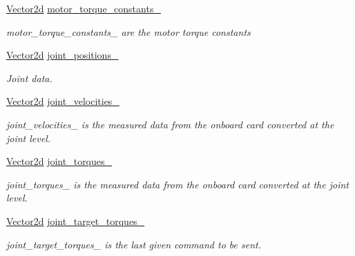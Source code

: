 \begin{DoxyCompactItemize}
\hyperlink{common__header_8hpp_acb6916bc8c9fe9d98c484fd4cc201447}{Vector2d} \hyperlink{classblmc__robots_1_1Teststand_a0d4bfad1f7afaaf459131667fac2b2d0}{motor\+\_\+torque\+\_\+constants\+\_\+}
\begin{DoxyCompactList}\small\item\em motor\+\_\+torque\+\_\+constants\+\_\+ are the motor torque constants \end{DoxyCompactList}\item 
\hyperlink{common__header_8hpp_acb6916bc8c9fe9d98c484fd4cc201447}{Vector2d} \hyperlink{classblmc__robots_1_1Teststand_a5ff6d1081ece6fadf9b3bac578b08001}{joint\+\_\+positions\+\_\+}
\begin{DoxyCompactList}\small\item\em Joint data. \end{DoxyCompactList}\item 
\mbox{\label{classblmc__robots_1_1Teststand_ab0a776f921bec24b81bc08f7ceebcba6}} 
\hyperlink{common__header_8hpp_acb6916bc8c9fe9d98c484fd4cc201447}{Vector2d} \hyperlink{classblmc__robots_1_1Teststand_ab0a776f921bec24b81bc08f7ceebcba6}{joint\+\_\+velocities\+\_\+}
\begin{DoxyCompactList}\small\item\em joint\+\_\+velocities\+\_\+ is the measured data from the onboard card converted at the joint level. \end{DoxyCompactList}\item 
\mbox{\label{classblmc__robots_1_1Teststand_a59ef3d86efd043ee1511bad70624bdae}} 
\hyperlink{common__header_8hpp_acb6916bc8c9fe9d98c484fd4cc201447}{Vector2d} \hyperlink{classblmc__robots_1_1Teststand_a59ef3d86efd043ee1511bad70624bdae}{joint\+\_\+torques\+\_\+}
\begin{DoxyCompactList}\small\item\em joint\+\_\+torques\+\_\+ is the measured data from the onboard card converted at the joint level. \end{DoxyCompactList}\item 
\mbox{\label{classblmc__robots_1_1Teststand_a0db888b3e84fe194629bb14b6fa2e485}} 
\hyperlink{common__header_8hpp_acb6916bc8c9fe9d98c484fd4cc201447}{Vector2d} \hyperlink{classblmc__robots_1_1Teststand_a0db888b3e84fe194629bb14b6fa2e485}{joint\+\_\+target\+\_\+torques\+\_\+}
\begin{DoxyCompactList}\small\item\em joint\+\_\+target\+\_\+torques\+\_\+ is the last given command to be sent. \end{DoxyCompactList}\item 

\end{DoxyCompactItemize}
